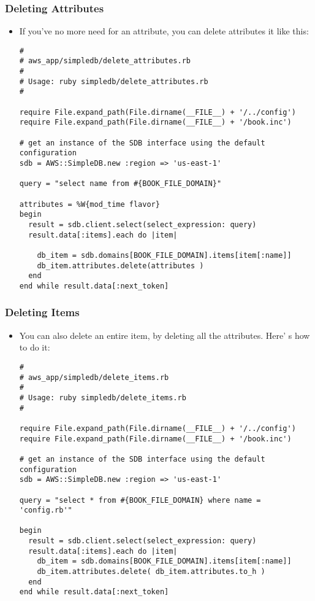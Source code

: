 \documentclass{beamer}
\begin{document}
\begin{frame}
\frametitle{Deleting Attributes}
\begin{itemize}
\item If you’ve no more need for an attribute, you can delete attributes it like this:

\lstset{language=Ruby, style=eclipse}
\begin{lstlisting}[escapechar=!]
#
# aws_app/simpledb/delete_attributes.rb
#
# Usage: ruby simpledb/delete_attributes.rb
#

require File.expand_path(File.dirname(__FILE__) + '/../config')
require File.expand_path(File.dirname(__FILE__) + '/book.inc')

# get an instance of the SDB interface using the default configuration
sdb = AWS::SimpleDB.new :region => 'us-east-1'

query = "select name from #{BOOK_FILE_DOMAIN}"

attributes = %W{mod_time flavor}
begin
  result = sdb.client.select(select_expression: query)
  result.data[:items].each do |item|

    db_item = sdb.domains[BOOK_FILE_DOMAIN].items[item[:name]]
    db_item.attributes.delete(attributes )
  end
end while result.data[:next_token]
\end{lstlisting}
\end{itemize}

\end{frame}

\begin{frame}
\frametitle{Deleting Items}
\begin{itemize}
\item You can also delete an entire item, by deleting all the attributes. Here’ s how to do it:

\lstset{language=Ruby, style=eclipse}
\begin{lstlisting}[escapechar=!]
#
# aws_app/simpledb/delete_items.rb
#
# Usage: ruby simpledb/delete_items.rb
#

require File.expand_path(File.dirname(__FILE__) + '/../config')
require File.expand_path(File.dirname(__FILE__) + '/book.inc')

# get an instance of the SDB interface using the default configuration
sdb = AWS::SimpleDB.new :region => 'us-east-1'

query = "select * from #{BOOK_FILE_DOMAIN} where name = 'config.rb'"

begin
  result = sdb.client.select(select_expression: query)
  result.data[:items].each do |item|
    db_item = sdb.domains[BOOK_FILE_DOMAIN].items[item[:name]]
    db_item.attributes.delete( db_item.attributes.to_h )
  end
end while result.data[:next_token]
\end{lstlisting}
\end{itemize}

\end{frame}
\end{document}
